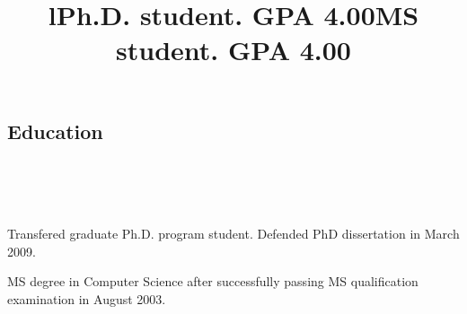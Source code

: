 \documentclass[12pt,overlapped,line]{res}
\begin{document}
\begin{resume}





\section{Education}
\begin{format}
  \title{l}\\
  \\
  \body\\
\end{format}

\title{Ph.D. student. GPA 4.00}
\begin{position}
  Transfered graduate Ph.D. program student. Defended PhD dissertation
  in March 2009.
\end{position}

 \title{MS student. GPA 4.00}
 \begin{position}
  MS degree in Computer Science after successfully passing MS
 qualification examination in August 2003.
 \end{position}


\end{resume}
\end{document}
